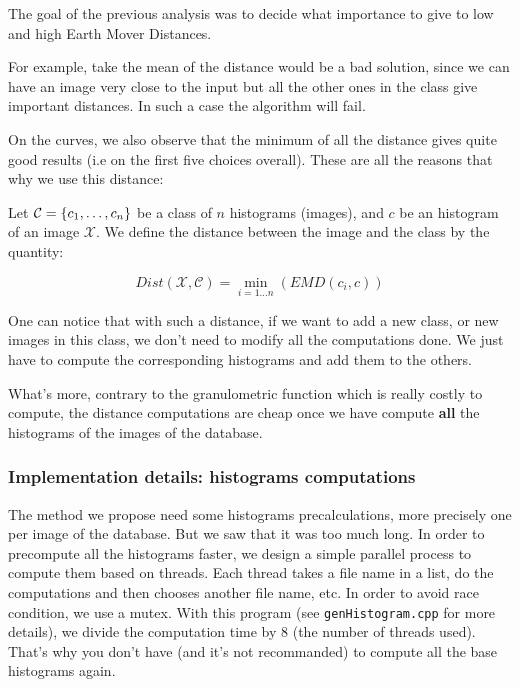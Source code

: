 The goal of the previous analysis was to decide what importance to give to low and high Earth Mover Distances.

For example, take the mean of the distance would be a bad solution, since we can have an image very close to the input but all the other ones in the class give important distances. In such a case the algorithm will fail.

On the curves, we also observe that the minimum of all the distance gives quite good results (i.e on the first five choices overall). These are all the reasons that why we use this distance:

\begin{definition}
	Let $\mathcal{C} = \left\{ c_1,\dots,c_n \right\}$ be a class of $n$ histograms (images), and $c$ be an histogram of an image $\mathcal{X}$. We define the distance between the image and the class by the quantity:

\[
	Dist(\mathcal{X},\mathcal{C}) = \underset{i = 1 \dots n}{\operatorname{min}} \left( EMD(c_i,c) \right)
\]

\end{definition}

One can notice that with such a distance, if we want to add a new class, or new images in this class, we don't need to modify all the computations done. We just have to compute the corresponding histograms and add them to the others.

What's more, contrary to the granulometric function which is really costly to compute, the distance computations are cheap once we have compute \textbf{all} the histograms of the images of the database.

\subsubsection{Implementation details: histograms computations}

The method we propose need some histograms precalculations, more precisely one per image of the database. But we saw that it was too much long. In order to precompute all the histograms faster, we design a simple parallel process to compute them based on threads. Each thread takes a file name in a list, do the computations and then chooses another file name, etc. In order to avoid race condition, we use a mutex. With this program (see \texttt{genHistogram.cpp} for more details), we divide the computation time by 8 (the number of threads used). That's why you don't have (and it's not recommanded) to compute all the base histograms again.

